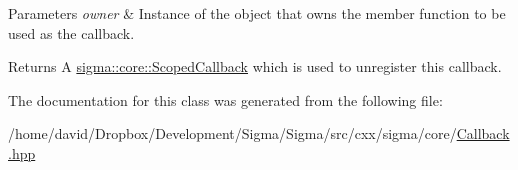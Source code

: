 \begin{DoxyParams}{Parameters}
{\em owner} & Instance of the object that owns the member function to be used as the callback.\\
\hline
\end{DoxyParams}
\begin{DoxyReturn}{Returns}
A \hyperlink{classsigma_1_1core_1_1_scoped_callback}{sigma\-::core\-::\-Scoped\-Callback} which is used to unregister this callback. 
\end{DoxyReturn}


The documentation for this class was generated from the following file\-:\begin{DoxyCompactItemize}
\item 
/home/david/\-Dropbox/\-Development/\-Sigma/\-Sigma/src/cxx/sigma/core/\hyperlink{_callback_8hpp}{Callback.\-hpp}\end{DoxyCompactItemize}
